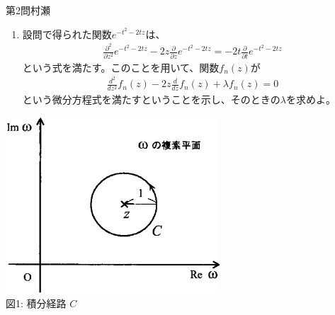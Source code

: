 \begin{question}{第2問}{村瀬}
\begin{enumerate}
\item
  設問で得られた関数$e^{-t^2-2tz}$は、
  \begin{align*}
    \frac{\partial^2}{\partial z^2} e^{-t^2-2tz}
    - 2z \frac{\partial}{\partial z} e^{-t^2-2tz}
    = -2t\frac{\partial}{\partial t} e^{-t^2-2tz}
  \end{align*}
  という式を満たす。このことを用いて、関数$f_n(z)$が
  \begin{align*}
    \frac{d^2}{dz^2} f_n(z)
    - 2z \frac{d}{dz} f_n(z) + \lambda f_n(z) = 0
  \end{align*}
  という微分方程式を満たすということを示し、そのときの$\lambda$を求めよ。
\end{enumerate}
\begin{center}
  \includegraphics[width=0.6\textwidth]{2007mathQ2_1r.eps}\\図1: 積分経路 $C$
\end{center}
\end{question}
